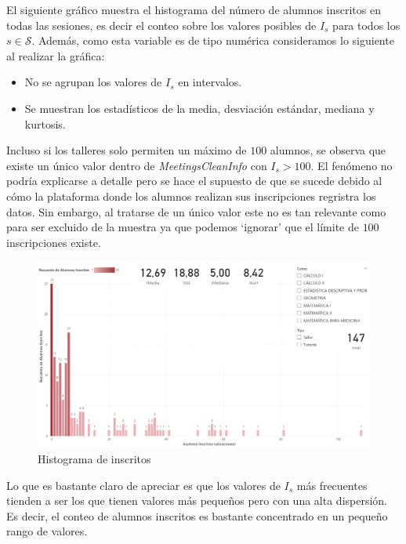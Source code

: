 \documentclass[11pt,a4paper]{book}
\theoremstyle{definition}%
\begin{document}
                El siguiente gráfico muestra el histograma del número de alumnos inscritos en todas las sesiones, es decir el conteo sobre los valores posibles de $I_s$ para todos los $s\in\mathcal{S}$. Además, como esta variable es de tipo numérica consideramos lo siguiente al realizar la gráfica:
                \begin{itemize}
                    \item No se agrupan los valores de $I_s$ en intervalos.
                    \item Se muestran los estadísticos de la media, desviación estándar, mediana y kurtosis.
                \end{itemize}
                Incluso si los talleres solo permiten un máximo de $100$ alumnos, se observa que existe un único valor dentro de \textit{MeetingsCleanInfo} con $I_s>100$. El fenómeno no podría explicarse a detalle pero se hace el supuesto de que se sucede debido al cómo la plataforma donde los alumnos realizan sus inscripciones regristra los datos. Sin embargo, al tratarse de un único valor este no es tan relevante como para ser excluido de la muestra ya que podemos `ignorar' que el límite de $100$ inscripciones existe.
                \begin{figure}[H]
                    \centering
                    \includegraphics[width=1\textwidth]{Sources/histograma_InscritosGlobal.png}
                    \caption{Histograma de inscritos}
                    \label{fig:histograma_InscritosGlobal}
                \end{figure}
                Lo que es bastante claro de apreciar es que los valores de $I_s$ más frecuentes tienden a ser los que tienen valores más pequeños pero con una alta dispersión. Es decir, el conteo de alumnos inscritos es bastante concentrado en un pequeño rango de valores.
\end{document}
